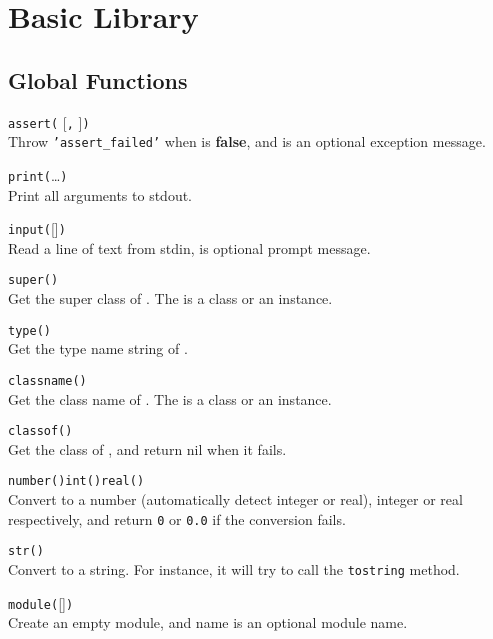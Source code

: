 \section*{Basic Library}

\subsection*{Global Functions}

\hangpar \texttt{assert(} [\texttt{,} ]\texttt{)}\\
Throw \texttt{'assert\_failed'} when  is \textbf{false}, and  is an optional exception message.

\hangpar \texttt{print(}\dots\texttt{)}\\
Print all arguments to stdout.

\hangpar \texttt{input(}[]\texttt{)}\\
Read a line of text from stdin,  is optional prompt message.

\hangpar \texttt{super(}\texttt{)}\\
Get the super class of . The  is a class or an instance.

\hangpar \texttt{type(}\texttt{)}\\
Get the type name string of .

\hangpar \texttt{classname(}\texttt{)}\\
Get the class name of . The  is a class or an instance.

\hangpar \texttt{classof(}\texttt{)}\\
Get the class of , and return nil when it fails.

\hangpar \texttt{number(}\texttt{)}\quad \hangpar \texttt{int(}\texttt{)}\quad \hangpar \texttt{real(}\texttt{)}\\
Convert  to a number (automatically detect integer or real), integer or real respectively, and return \texttt{0} or \texttt{0.0} if the conversion fails.

\hangpar \texttt{str(}\texttt{)}\\
Convert  to a string. For instance, it will try to call the \texttt{tostring} method.

\hangpar \texttt{module(}[]\texttt{)}\\
Create an empty module, and name is an optional module name.

